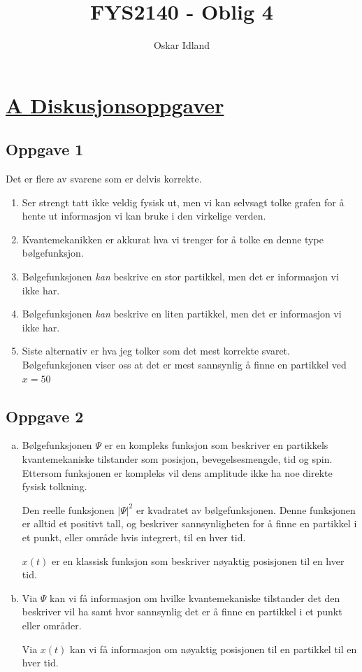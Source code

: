 \documentclass{article}
\author{Oskar Idland}
\title{FYS2140 - Oblig 4}
\date{}
\begin{document}
\maketitle
\newpage

\section*{\underline{A Diskusjonsoppgaver}}
\subsection*{Oppgave 1}
Det er flere av svarene som er delvis korrekte. 
\begin{enumerate}[\bf A:]
    \item Ser strengt tatt ikke veldig fysisk ut, men vi kan selvsagt tolke grafen for å hente ut informasjon vi kan bruke i den virkelige verden. 
    \item Kvantemekanikken er akkurat hva vi trenger for å tolke en denne type bølgefunksjon. 
    \item Bølgefunksjonen \textit{kan} beskrive en stor partikkel, men det er informasjon vi ikke har. 
    \item Bølgefunksjonen \textit{kan} beskrive en liten partikkel, men det er informasjon vi ikke har. 
    \item Siste alternativ er hva jeg tolker som det mest korrekte svaret. Bølgefunksjonen viser oss at det er mest sannsynlig å finne en partikkel ved $x = 50$
\end{enumerate}
\subsection*{Oppgave 2}
\begin{enumerate}[a)]
    \item Bølgefunksjonen $Ψ$ er en kompleks funksjon som beskriver en partikkels kvantemekaniske tilstander som posisjon, bevegelsesmengde, tid og spin. Ettersom funksjonen er kompleks vil dens amplitude ikke ha noe direkte fysisk tolkning. 
    
    Den reelle funksjonen $\left|Ψ\right|^2 $ er kvadratet av bølgefunksjonen. Denne funksjonen er alltid et positivt tall, og beskriver sannsynligheten for å finne en partikkel i et punkt, eller område hvis integrert, til en hver tid. 
    
    $x(t)$ er en klassisk funksjon som beskriver nøyaktig posisjonen til en hver tid. 
    \item Via $Ψ$ kan vi få informasjon om hvilke kvantemekaniske tilstander det den beskriver vil ha samt hvor sannsynlig det er å finne en partikkel i et punkt eller områder. 
    
    Via $x(t)$ kan vi få informasjon om nøyaktig posisjonen til en partikkel til en hver tid.
\end{enumerate}
\end{document}
